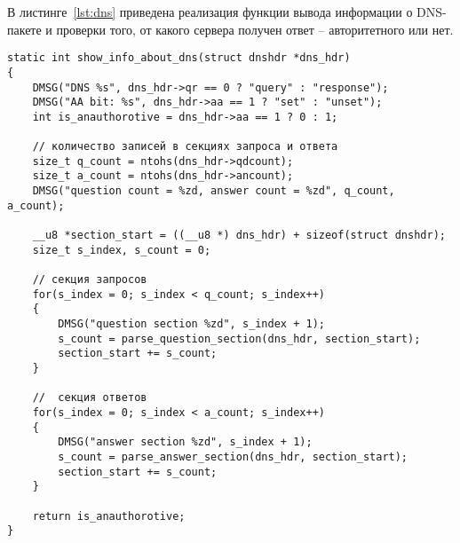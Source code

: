 В листинге~\ref{lst:dns} приведена реализация функции вывода информации о DNS-пакете и проверки того, от какого сервера получен ответ -- авторитетного или нет.

\begin{lstlisting}[caption = {Функция вывода информации о DNS-пакете}, label=lst:dns]
static int show_info_about_dns(struct dnshdr *dns_hdr)
{
	DMSG("DNS %s", dns_hdr->qr == 0 ? "query" : "response"); 
	DMSG("AA bit: %s", dns_hdr->aa == 1 ? "set" : "unset");
	int is_anauthorotive = dns_hdr->aa == 1 ? 0 : 1;
	
	// количество записей в секциях запроса и ответа  
	size_t q_count = ntohs(dns_hdr->qdcount);
	size_t a_count = ntohs(dns_hdr->ancount);
	DMSG("question count = %zd, answer count = %zd", q_count, a_count);
	
	__u8 *section_start = ((__u8 *) dns_hdr) + sizeof(struct dnshdr);
	size_t s_index, s_count = 0;
	
	// секция запросов
	for(s_index = 0; s_index < q_count; s_index++)
	{
		DMSG("question section %zd", s_index + 1);
		s_count = parse_question_section(dns_hdr, section_start);
		section_start += s_count;
	}
	
	//  секция ответов
	for(s_index = 0; s_index < a_count; s_index++)
	{
		DMSG("answer section %zd", s_index + 1);
		s_count = parse_answer_section(dns_hdr, section_start);
		section_start += s_count;
	}
	
	return is_anauthorotive;
}
\end{lstlisting}


